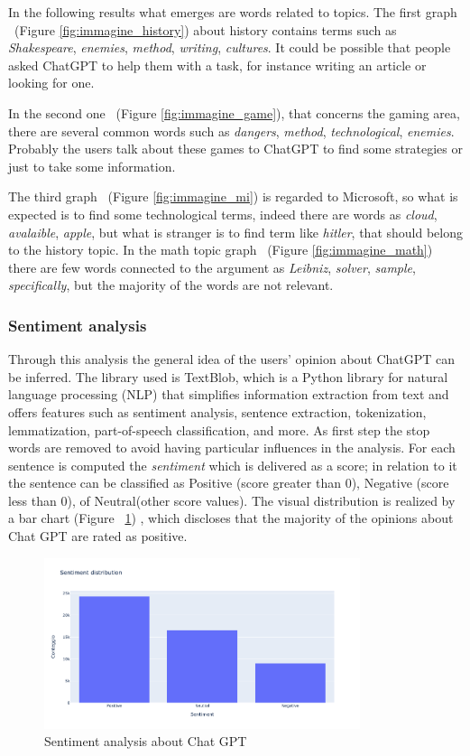 \documentclass[sigchi]{acmart}
\begin{document}
In the following results what emerges are words related to topics. The first graph ~(Figure \ref{fig:immagine_history}) about history contains terms such as \textit{Shakespeare}, \textit{enemies}, \textit{method}, \textit{writing}, \textit{cultures}. It could be possible that people asked ChatGPT to help them with a task, for instance writing an article or looking for one.

In the second one ~(Figure \ref{fig:immagine_game}), that concerns the gaming area, there are several common words such as \textit{dangers}, \textit{method}, \textit{technological}, \textit{enemies}. Probably the users talk about these games to ChatGPT to find some strategies or just to take some information. 

The third graph ~(Figure \ref{fig:immagine_mi}) is regarded to Microsoft, so what is expected is to find some technological terms, indeed there are words as \textit{cloud}, \textit{avalaible}, \textit{apple}, but what is stranger is to find term like \textit{hitler}, that should belong to the history topic. In the math topic graph ~(Figure \ref{fig:immagine_math}) there are few words connected to the argument as \textit{Leibniz}, \textit{solver}, \textit{sample}, \textit{specifically}, but the majority of the words are not relevant.

\subsubsection{Sentiment analysis} Through this analysis the general idea of the users' opinion about ChatGPT can be inferred. The library used is TextBlob, which is a Python library for natural language processing (NLP) that simplifies information extraction from text and offers features such as sentiment analysis, sentence extraction, tokenization, lemmatization, part-of-speech classification, and more. As first step the stop words are removed to avoid having particular influences in the analysis. For each sentence is computed the \textit{sentiment} which is delivered as a score; in relation to it the sentence can be classified as Positive (score greater than 0), Negative (score less than 0), of Neutral(other score values). The visual distribution is realized by a bar chart (Figure ~\ref{fig:immagine_sentiment}) , which discloses that the majority of the opinions about Chat GPT are rated as positive. 

\begin{figure}[H]
  \centering
  \includegraphics[height=5cm]{sentiment.png}
  \caption{Sentiment analysis about Chat GPT}
  \label{fig:immagine_sentiment}
\end{figure}
\end{document}
